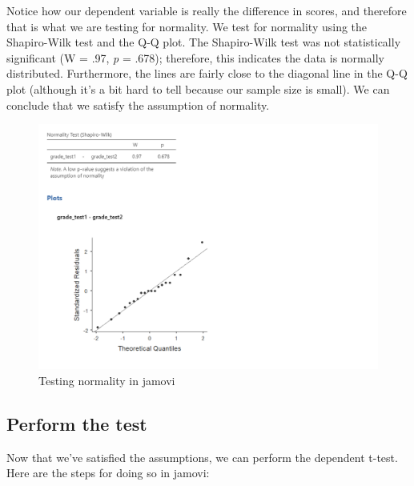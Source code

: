 \documentclass[
]{book}
\begin{document}
Notice how our dependent variable is really the difference in scores, and therefore that is what we are testing for normality. We test for normality using the Shapiro-Wilk test and the Q-Q plot. The Shapiro-Wilk test was not statistically significant (W = .97, \emph{p} = .678); therefore, this indicates the data is normally distributed. Furthermore, the lines are fairly close to the diagonal line in the Q-Q plot (although it's a bit hard to tell because our sample size is small). We can conclude that we satisfy the assumption of normality.

\begin{figure}

{\centering \includegraphics[width=1\linewidth]{images/03_dependent_t-test/dependent_normality} 

}

\caption{Testing normality in jamovi}\label{fig:unnamed-chunk-5}
\end{figure}

\hypertarget{perform-the-test-2}{%
\subsection{Perform the test}\label{perform-the-test-2}}

Now that we've satisfied the assumptions, we can perform the dependent t-test. Here are the steps for doing so in jamovi:
\end{document}
